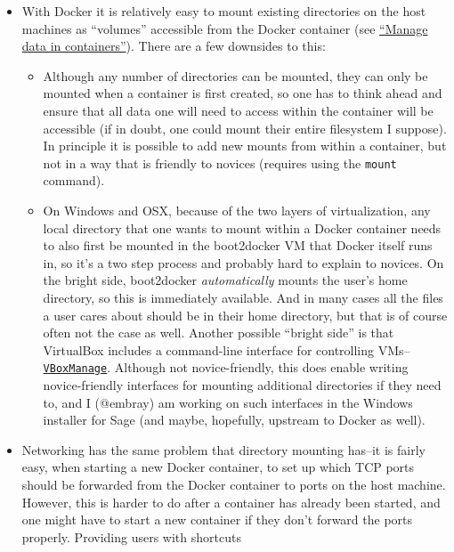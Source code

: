 \begin{itemize}
\item
  With Docker it is relatively easy to mount existing directories on the
  host machines as ``volumes'' accessible from the Docker container (see
  \href{https://docs.docker.com/engine/userguide/containers/dockervolumes/}{``Manage
  data in containers''}). There are a few downsides to this:

  \begin{itemize}
  \item
    Although any number of directories can be mounted, they can only be
    mounted when a container is first created, so one has to think ahead
    and ensure that all data one will need to access within the
    container will be accessible (if in doubt, one could mount their
    entire filesystem I suppose). In principle it is possible to add new
    mounts from within a container, but not in a way that is friendly to
    novices (requires using the \texttt{mount} command).
  \item
    On Windows and OSX, because of the two layers of virtualization, any
    local directory that one wants to mount within a Docker container
    needs to also first be mounted in the boot2docker VM that Docker
    itself runs in, so it's a two step process and probably hard to
    explain to novices. On the bright side, boot2docker
    \emph{automatically} mounts the user's home directory, so this is
    immediately available. And in many cases all the files a user cares
    about should be in their home directory, but that is of course often
    not the case as well. Another possible ``bright side'' is that
    VirtualBox includes a command-line interface for controlling
    VMs--\href{https://www.virtualbox.org/manual/ch08.html}{\texttt{VBoxManage}}.
    Although not novice-friendly, this does enable writing
    novice-friendly interfaces for mounting additional directories if
    they need to, and I (@embray) am working on such interfaces in the
    Windows installer for Sage (and maybe, hopefully, upstream to Docker
    as well).
  \end{itemize}
\item
  Networking has the same problem that directory mounting has--it is
  fairly easy, when starting a new Docker container, to set up which TCP
  ports should be forwarded from the Docker container to ports on the
  host machine. However, this is harder to do after a container has
  already been started, and one might have to start a new container if
  they don't forward the ports properly. Providing users with shortcuts

\end{itemize}
